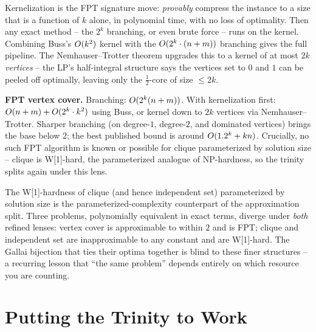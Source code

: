 \begin{focusbox}
Kernelization is the FPT signature move: \emph{provably} compress the instance to
a size that is a function of $k$ alone, in polynomial time, with no loss of
optimality. Then any exact method -- the $2^k$ branching, or even brute force --
runs on the kernel. Combining Buss's $O(k^2)$ kernel with the
$O(2^k\cdot(n+m))$ branching gives the full pipeline. The Nemhauser--Trotter
theorem upgrades this to a kernel of at most $2k$ \emph{vertices} -- the LP's
half-integral structure says the vertices set to $0$ and $1$ can be peeled off
optimally, leaving only the $\tfrac12$-core of size $\le 2k$.
\end{focusbox}

\begin{complexitybox}
\textbf{FPT vertex cover.} Branching: $O(2^k(n+m))$. With kernelization first:
$O(n+m)+O(2^k\cdot k^2)$ using Buss, or kernel down to $2k$ vertices via
Nemhauser--Trotter. Sharper branching (on degree-$1$, degree-$2$, and dominated
vertices) brings the base below $2$; the best published bound is around
$O(1.2^k+kn)$. Crucially, no such FPT algorithm is known or possible for clique
parameterized by solution size -- clique is W[1]-hard, the parameterized analogue
of NP-hardness, so the trinity splits again under this lens.
\end{complexitybox}

\begin{connectionbox}
The W[1]-hardness of clique (and hence independent set) parameterized by solution
size is the parameterized-complexity counterpart of the approximation split. Three
problems, polynomially equivalent in exact terms, diverge under \emph{both}
refined lenses: vertex cover is approximable to within $2$ and is FPT; clique and
independent set are inapproximable to any constant and are W[1]-hard. The Gallai
bijection that ties their optima together is blind to these finer structures -- a
recurring lesson that ``the same problem'' depends entirely on which resource you
are counting.
\end{connectionbox}

\section{Putting the Trinity to Work}
\label{ch29:wrapup}

